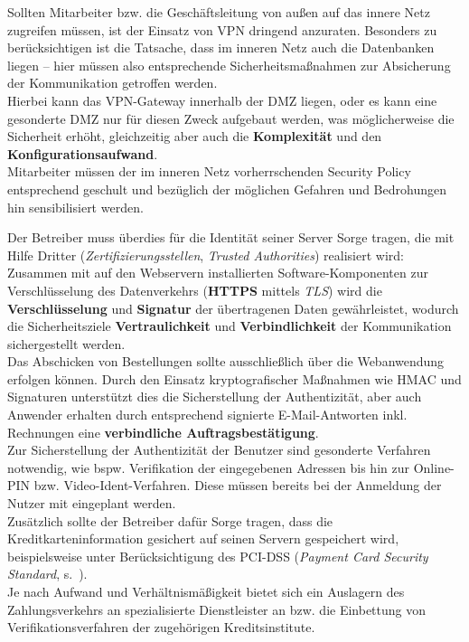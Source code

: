 \noindent
Sollten Mitarbeiter bzw. die Geschäftsleitung von außen auf das innere Netz zugreifen müssen, ist der Einsatz von VPN dringend anzuraten. Besonders zu berücksichtigen ist die Tatsache, dass im inneren Netz auch die Datenbanken liegen – hier müssen also entsprechende Sicherheitsmaßnahmen zur Absicherung der Kommunikation getroffen werden.\\
Hierbei kann das VPN-Gateway innerhalb der DMZ liegen, oder es kann eine gesonderte DMZ nur für diesen Zweck aufgebaut werden, was möglicherweise die Sicherheit erhöht, gleichzeitig aber auch die \textbf{Komplexität} und den \textbf{Konfigurationsaufwand}.\\
Mitarbeiter müssen der im inneren Netz vorherrschenden Security Policy entsprechend geschult und bezüglich der möglichen Gefahren und Bedrohungen hin sensibilisiert werden.

\noindent
Der Betreiber muss überdies für die Identität seiner Server Sorge tragen, die mit Hilfe Dritter (\textit{Zertifizierungsstellen}, \textit{Trusted Authorities}) realisiert wird: Zusammen mit auf den Webservern installierten Software-Komponenten zur Verschlüsselung des Datenverkehrs (\textbf{HTTPS} mittels \textit{TLS}) wird die \textbf{Verschlüsselung} und \textbf{Signatur} der übertragenen Daten gewährleistet, wodurch die Sicherheitsziele \textbf{Vertraulichkeit} und \textbf{Verbindlichkeit} der Kommunikation sichergestellt werden.\\

\noindent
Das Abschicken von Bestellungen sollte ausschließlich über die Webanwendung erfolgen können.
Durch den Einsatz kryptografischer Maßnahmen wie HMAC und Signaturen unterstützt dies die Sicherstellung der Authentizität, aber auch Anwender erhalten durch entsprechend signierte E-Mail-Antworten inkl. Rechnungen eine \textbf{verbindliche Auftragsbestätigung}.\\

\noindent
Zur Sicherstellung der Authentizität der Benutzer sind gesonderte Verfahren notwendig, wie bspw. Verifikation der eingegebenen Adressen bis hin zur Online-PIN bzw. Video-Ident-Verfahren. Diese müssen bereits bei der Anmeldung der Nutzer mit eingeplant werden.\\
Zusätzlich sollte der Betreiber dafür Sorge tragen, dass die Kreditkarteninformation gesichert auf seinen Servern gespeichert wird, beispielsweise unter Berücksichtigung des PCI-DSS (\textit{Payment Card Security Standard}, s.~\cite[57 ff.]{ITS1}).\\
Je nach Aufwand und Verhältnismäßigkeit bietet sich ein Auslagern des Zahlungsverkehrs an spezialisierte Dienstleister an bzw. die Einbettung von Verifikationsverfahren der zugehörigen Kreditsinstitute.\\

